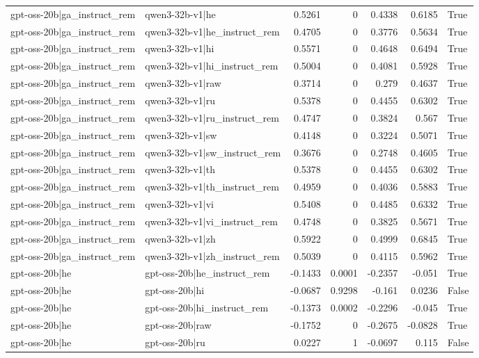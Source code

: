 \begin{table}
\begin{tabular}{l l r r r r l}
gpt-oss-20b|ga_instruct_rem & qwen3-32b-v1|he & 0.5261 & 0 & 0.4338 & 0.6185 & True \\
gpt-oss-20b|ga_instruct_rem & qwen3-32b-v1|he_instruct_rem & 0.4705 & 0 & 0.3776 & 0.5634 & True \\
gpt-oss-20b|ga_instruct_rem & qwen3-32b-v1|hi & 0.5571 & 0 & 0.4648 & 0.6494 & True \\
gpt-oss-20b|ga_instruct_rem & qwen3-32b-v1|hi_instruct_rem & 0.5004 & 0 & 0.4081 & 0.5928 & True \\
gpt-oss-20b|ga_instruct_rem & qwen3-32b-v1|raw & 0.3714 & 0 & 0.279 & 0.4637 & True \\
gpt-oss-20b|ga_instruct_rem & qwen3-32b-v1|ru & 0.5378 & 0 & 0.4455 & 0.6302 & True \\
gpt-oss-20b|ga_instruct_rem & qwen3-32b-v1|ru_instruct_rem & 0.4747 & 0 & 0.3824 & 0.567 & True \\
gpt-oss-20b|ga_instruct_rem & qwen3-32b-v1|sw & 0.4148 & 0 & 0.3224 & 0.5071 & True \\
gpt-oss-20b|ga_instruct_rem & qwen3-32b-v1|sw_instruct_rem & 0.3676 & 0 & 0.2748 & 0.4605 & True \\
gpt-oss-20b|ga_instruct_rem & qwen3-32b-v1|th & 0.5378 & 0 & 0.4455 & 0.6302 & True \\
gpt-oss-20b|ga_instruct_rem & qwen3-32b-v1|th_instruct_rem & 0.4959 & 0 & 0.4036 & 0.5883 & True \\
gpt-oss-20b|ga_instruct_rem & qwen3-32b-v1|vi & 0.5408 & 0 & 0.4485 & 0.6332 & True \\
gpt-oss-20b|ga_instruct_rem & qwen3-32b-v1|vi_instruct_rem & 0.4748 & 0 & 0.3825 & 0.5671 & True \\
gpt-oss-20b|ga_instruct_rem & qwen3-32b-v1|zh & 0.5922 & 0 & 0.4999 & 0.6845 & True \\
gpt-oss-20b|ga_instruct_rem & qwen3-32b-v1|zh_instruct_rem & 0.5039 & 0 & 0.4115 & 0.5962 & True \\
gpt-oss-20b|he & gpt-oss-20b|he_instruct_rem & -0.1433 & 0.0001 & -0.2357 & -0.051 & True \\
gpt-oss-20b|he & gpt-oss-20b|hi & -0.0687 & 0.9298 & -0.161 & 0.0236 & False \\
gpt-oss-20b|he & gpt-oss-20b|hi_instruct_rem & -0.1373 & 0.0002 & -0.2296 & -0.045 & True \\
gpt-oss-20b|he & gpt-oss-20b|raw & -0.1752 & 0 & -0.2675 & -0.0828 & True \\
gpt-oss-20b|he & gpt-oss-20b|ru & 0.0227 & 1 & -0.0697 & 0.115 & False \\

\end{tabular}
\end{table}
